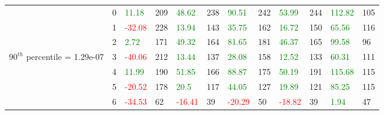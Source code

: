 \begin{table}[htb!]
\begin{adjustwidth}{-0.9in}{-0.9in}
\begin{tabular}{|p{5em}|p{2em}|p{3em}|p{3em}|p{3em}|p{3em}|p{3em}|p{3em}|p{3em}|p{3em}|p{3em}|p{3em}|}
            & 0 & \textcolor{green}{11.18} & 209 & \textcolor{green}{48.62} & 238 & \textcolor{green}{90.51} & 242 & \textcolor{green}{53.99} & 244 & \textcolor{green}{112.82} & 105\\\cline{3-12}
            & 1 & \textcolor{red}{-32.08} & 228 & \textcolor{green}{13.94} & 143 & \textcolor{green}{35.75} & 162 & \textcolor{green}{16.72} & 150 & \textcolor{green}{65.56} & 116\\\cline{3-12}
            & 2 & \textcolor{green}{2.72} & 171 & \textcolor{green}{49.32} & 164 & \textcolor{green}{81.65} & 181 & \textcolor{green}{46.37} & 165 & \textcolor{green}{99.58} & 96\\\cline{3-12}
            $90^{th}$ percentile = 1.29e-07 & 3 & \textcolor{red}{-40.06} & 212 & \textcolor{green}{13.44} & 137 & \textcolor{green}{28.08} & 158 & \textcolor{green}{12.52} & 133 & \textcolor{green}{60.31} & 111\\\cline{3-12}
            & 4 & \textcolor{green}{11.99} & 190 & \textcolor{green}{51.85} & 166 & \textcolor{green}{88.87} & 175 & \textcolor{green}{50.19} & 191 & \textcolor{green}{115.68} & 115\\\cline{3-12}
            & 5 & \textcolor{red}{-20.52} & 178 & \textcolor{green}{20.5} & 117 & \textcolor{green}{44.05} & 127 & \textcolor{green}{19.89} & 121 & \textcolor{green}{85.25} & 115\\\cline{3-12}
            & 6 & \textcolor{red}{-34.53} & 62 & \textcolor{red}{-16.41} & 39 & \textcolor{red}{-20.29} & 50 & \textcolor{red}{-18.82} & 39 & \textcolor{green}{1.94} & 47\\\hline\hline


\end{tabular}
\end{adjustwidth}
\end{table}
